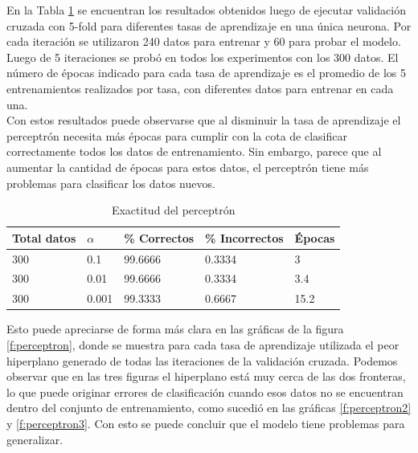 \documentclass[a4paper]{article}
\begin{document}
		En la Tabla \ref{tabla:accPerceptron} se encuentran los resultados obtenidos luego de ejecutar validación cruzada con 5-fold para diferentes tasas de aprendizaje en una única neurona. Por cada iteración se utilizaron 240 datos para entrenar y 60 para probar el modelo. Luego de 5 iteraciones se probó en todos los experimentos con los 300 datos. El número de épocas indicado para cada tasa de aprendizaje es el promedio de los 5 entrenamientos realizados por tasa, con diferentes datos para entrenar en cada una.\\
		
		Con estos resultados puede observarse que al disminuir la tasa de aprendizaje el perceptrón necesita más épocas para cumplir con la cota de clasificar correctamente todos los datos de entrenamiento. Sin embargo, parece que al aumentar la cantidad de épocas para estos datos, el perceptrón tiene más problemas para clasificar los datos nuevos.
		
	
		\begin{table}[H]
		\begin{center}
		\begin{tabular}{|l|l|l|l|l|}
		\hline
		Total datos & $\alpha$ & \% Correctos & \% Incorrectos & Épocas\\
		\hline \hline
		300 & 0.1 & 99.6666 & 0.3334 & 3\\ \hline
		300 & 0.01 & 99.6666 & 0.3334 & 3.4\\ \hline
		300 & 0.001 & 99.3333 & 0.6667 & 15.2\\ \hline
		\end{tabular}
		\caption{Exactitud del perceptrón}
		\label{tabla:accPerceptron}
		\end{center}
		\end{table}
					
		Esto puede apreciarse de forma más clara en las gráficas de la figura \ref{f:perceptron}, donde se muestra para cada tasa de aprendizaje utilizada el peor hiperplano generado de todas las iteraciones de la validación cruzada. Podemos observar que en las tres figuras el hiperplano está muy cerca de las dos fronteras, lo que puede originar errores de clasificación cuando esos datos no se encuentran dentro del conjunto de entrenamiento, como sucedió en las gráficas \ref{f:perceptron2} y \ref{f:perceptron3}. Con esto se puede concluir que el modelo tiene problemas para generalizar.			
				
\end{document}
